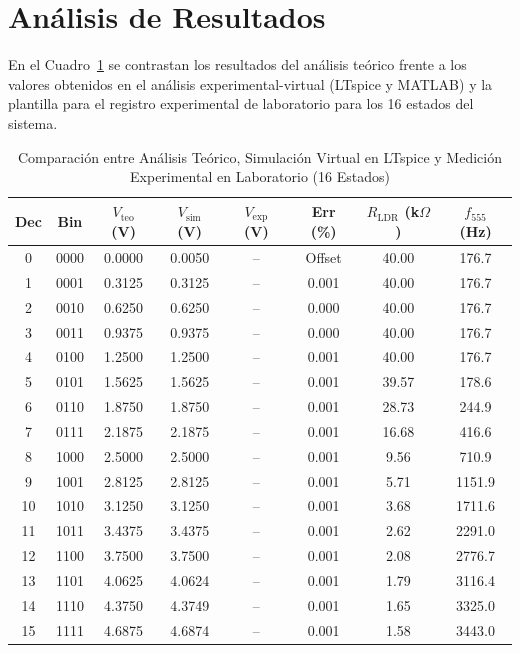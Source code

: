 \documentclass[journal,transmag]{IEEEtran}
\begin{document}
\section{Análisis de Resultados}
En el Cuadro~\ref{tab:resultados} se contrastan los resultados del análisis teórico frente a los valores obtenidos en el análisis experimental-virtual (LTspice y MATLAB) y la plantilla para el registro experimental de laboratorio para los 16 estados del sistema.

\begin{table}[htbp]
\caption{Comparación entre Análisis Teórico, Simulación Virtual en LTspice y Medición Experimental en Laboratorio (16 Estados)}
\label{tab:resultados}
\centering
\footnotesize
\setlength{\tabcolsep}{2.5pt}
\renewcommand{\arraystretch}{1.06}
\begin{tabular}{cccccccc}
\toprule
\textbf{Dec} & \textbf{Bin} & $V_{\text{teo}}$ \textbf{(V)} & $V_{\text{sim}}$ \textbf{(V)} & $V_{\text{exp}}$ \textbf{(V)} & \textbf{Err (\%)} & $R_{\text{LDR}}$ \textbf{(k$\Omega$)} & $f_{555}$ \textbf{(Hz)} \\
\midrule
0  & 0000 & 0.0000 & 0.0050 & -- & Offset & 40.00 & 176.7 \\
1  & 0001 & 0.3125 & 0.3125 & -- & 0.001  & 40.00 & 176.7 \\
2  & 0010 & 0.6250 & 0.6250 & -- & 0.000  & 40.00 & 176.7 \\
3  & 0011 & 0.9375 & 0.9375 & -- & 0.000  & 40.00 & 176.7 \\
4  & 0100 & 1.2500 & 1.2500 & -- & 0.001  & 40.00 & 176.7 \\
5  & 0101 & 1.5625 & 1.5625 & -- & 0.001  & 39.57 & 178.6 \\
6  & 0110 & 1.8750 & 1.8750 & -- & 0.001  & 28.73 & 244.9 \\
7  & 0111 & 2.1875 & 2.1875 & -- & 0.001  & 16.68 & 416.6 \\
8  & 1000 & 2.5000 & 2.5000 & -- & 0.001  &  9.56 & 710.9 \\
9  & 1001 & 2.8125 & 2.8125 & -- & 0.001  &  5.71 & 1151.9 \\
10 & 1010 & 3.1250 & 3.1250 & -- & 0.001  &  3.68 & 1711.6 \\
11 & 1011 & 3.4375 & 3.4375 & -- & 0.001  &  2.62 & 2291.0 \\
12 & 1100 & 3.7500 & 3.7500 & -- & 0.001  &  2.08 & 2776.7 \\
13 & 1101 & 4.0625 & 4.0624 & -- & 0.001  &  1.79 & 3116.4 \\
14 & 1110 & 4.3750 & 4.3749 & -- & 0.001  &  1.65 & 3325.0 \\
15 & 1111 & 4.6875 & 4.6874 & -- & 0.001  &  1.58 & 3443.0 \\
\bottomrule
\end{tabular}
\end{table}
\end{document}
